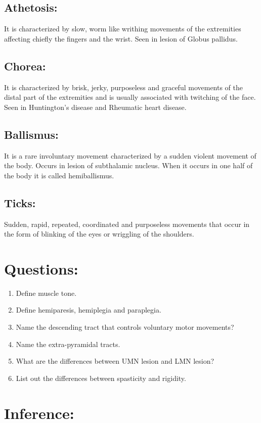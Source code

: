 \documentclass[a4paper,12pt,openany,oneside]{book}
\begin{document}
	\subsection*{Athetosis:}
		It is characterized by slow, worm like writhing movements of the extremities affecting chiefly the fingers and the wrist. Seen in lesion of Globus pallidus.
		\subsection*{Chorea:}
			It is characterized by brisk, jerky, purposeless and graceful movements of the distal part of the extremities and is usually associated with twitching of the face. Seen in Huntington's disease and Rheumatic heart disease.
			\subsection*{Ballismus:}
				It is a rare involuntary movement characterized by a sudden violent movement of the body. Occurs in lesion of subthalamic nucleus. When it occurs in one half of the body it is called hemiballismus.
				\subsection*{Ticks:}
				Sudden, rapid, repeated, coordinated and purposeless movements that occur in the form of blinking of the eyes or wriggling of the shoulders.
				\section*{Questions:}
				\begin{enumerate}
						\itemsep0em
\item{Define muscle tone.}
\item{Define hemiparesis, hemiplegia and paraplegia.}
\item{Name the descending tract that controls voluntary motor movements?}
\item{Name the extra-pyramidal tracts.}
\item{What are the differences between UMN lesion and LMN lesion?}
\item{List out the differences between spasticity and rigidity.}
				\end{enumerate}
\section*{Inference:}
\vspace{.1in}
\end{document}
